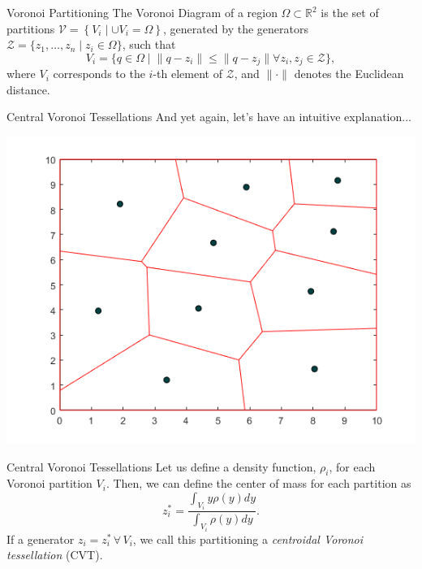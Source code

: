 \documentclass[t]{beamer}
\newcommand{\rsqr}{\mathbb{R}^2}
\begin{document}
\begin{frame}[label=vorpart3]{Voronoi Partitioning}
The Voronoi Diagram of a region $\Omega \subset \rsqr$ is the set of partitions $\mathcal{V} = \left\{V_{i} \mid \cup V_{i} = \Omega\right\}$, generated by the generators $\mathcal{Z} = \{z_1,\ldots,z_n\mid z_{i} \in \Omega\}$, such that
\begin{equation} \label{Voronoi Definition}
V_{i} = \{q\in\Omega \mid \lVert q - z_i \rVert \leq \lVert q - z_j \rVert \forall z_i,z_j\in\mathcal{Z}\},
\end{equation}
where $V_{i}$ corresponds to the $i$-th element of $\mathcal{Z}$, and $\lVert \cdot \rVert$ denotes the Euclidean distance.
\end{frame}

\begin{frame}[label=centvorpart1]{Central Voronoi Tessellations}
And yet again, let's have an intuitive explanation...
\begin{center}
\includegraphics[scale=0.5]{central-Voronoi-example.png}
\end{center}
\end{frame}

\begin{frame}[label=centvorpart2]{Central Voronoi Tessellations}
Let us define a density function, $\rho_i$, for each Voronoi partition $V_{i}$. Then, we can define the center of mass for each partition as
\begin{equation}
z_{i}^{*} = \frac{\int_{V_{i}}y\rho(y)dy}{\int_{V_{i}}\rho(y)dy}.
\end{equation}
If a generator $z_{i} = z_{i}^{*} \, \forall \,V_{i}$, we call this partitioning a \emph{centroidal Voronoi tessellation} (CVT).
\end{frame}
\end{document}
